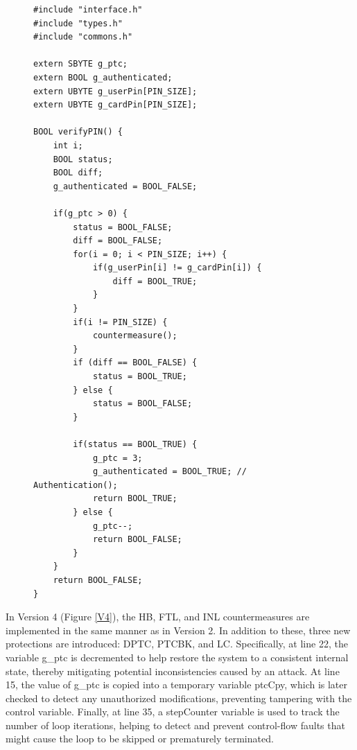 \begin{figure}
\begin{lstlisting}[caption={code.c of VerifyPin function in benchmark V3}, label={V3}, basicstyle=\ttfamily\footnotesize]
#include "interface.h"
#include "types.h"
#include "commons.h"

extern SBYTE g_ptc;
extern BOOL g_authenticated;
extern UBYTE g_userPin[PIN_SIZE];
extern UBYTE g_cardPin[PIN_SIZE];

BOOL verifyPIN() {
    int i;
    BOOL status;
    BOOL diff;
    g_authenticated = BOOL_FALSE;

    if(g_ptc > 0) {
        status = BOOL_FALSE;
        diff = BOOL_FALSE;
        for(i = 0; i < PIN_SIZE; i++) {
            if(g_userPin[i] != g_cardPin[i]) {
                diff = BOOL_TRUE;
            }
        }
        if(i != PIN_SIZE) {
            countermeasure();
        }
        if (diff == BOOL_FALSE) {
            status = BOOL_TRUE;
        } else {
            status = BOOL_FALSE;
        }

        if(status == BOOL_TRUE) {
            g_ptc = 3;
            g_authenticated = BOOL_TRUE; // Authentication();
            return BOOL_TRUE;
        } else {
            g_ptc--;
            return BOOL_FALSE;
        }
    }
    return BOOL_FALSE;
}
\end{lstlisting}
\end{figure}

In Version 4 (Figure \ref{V4}), the HB, FTL, and INL countermeasures are implemented in the same manner as in Version 2. In addition to these, three new protections are introduced: DPTC, PTCBK, and LC. Specifically, at line 22, the variable g\_ptc is decremented to help restore the system to a consistent internal state, thereby mitigating potential inconsistencies caused by an attack. At line 15, the value of g\_ptc is copied into a temporary variable ptcCpy, which is later checked to detect any unauthorized modifications, preventing tampering with the control variable. Finally, at line 35, a stepCounter variable is used to track the number of loop iterations, helping to detect and prevent control-flow faults that might cause the loop to be skipped or prematurely terminated.

